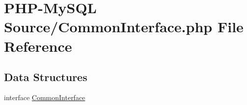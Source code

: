 \hypertarget{_common_interface_8php}{}\section{P\+H\+P-\/\+My\+S\+QL Source/\+Common\+Interface.php File Reference}
\label{_common_interface_8php}
\subsection*{Data Structures}
\begin{DoxyCompactItemize}
\item 
interface \hyperlink{interface_common_interface}{Common\+Interface}
\end{DoxyCompactItemize}
